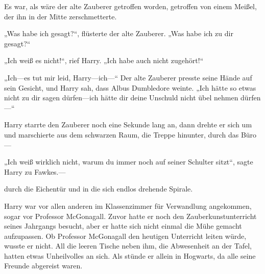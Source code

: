 Es war, als wäre der alte Zauberer getroffen worden, getroffen von einem Meißel, der ihn in der Mitte zerschmetterte.

„Was habe ich gesagt?“, flüsterte der alte Zauberer. „Was habe ich zu dir gesagt?“

„Ich weiß es nicht!“, rief Harry. „Ich habe auch nicht zugehört!“

„Ich—es tut mir leid, Harry—ich—“
Der alte Zauberer presste seine Hände auf sein Gesicht, und Harry sah, dass Albus Dumbledore weinte.
„Ich hätte so etwas nicht zu dir sagen dürfen—ich hätte dir deine Unschuld nicht übel nehmen dürfen—“

Harry starrte den Zauberer noch eine Sekunde lang an, dann drehte er sich um und marschierte aus dem schwarzen Raum, die Treppe hinunter, durch das Büro—

„Ich weiß wirklich nicht, warum du immer noch auf seiner Schulter sitzt“, sagte Harry zu Fawkes.—

durch die Eichentür und in die sich endlos drehende Spirale.

\later

Harry war vor allen anderen im Klassenzimmer für Verwandlung angekommen, sogar vor Professor McGonagall. Zuvor hatte er noch den Zauberkunstunterricht seines Jahrgangs besucht, aber er hatte sich nicht einmal die Mühe gemacht aufzupassen. Ob Professor McGonagall den heutigen Unterricht leiten würde, wusste er nicht.
All die leeren Tische neben ihm, die Abwesenheit an der Tafel, hatten etwas Unheilvolles an sich. Als stünde er allein in Hogwarts, da alle seine Freunde abgereist waren.

